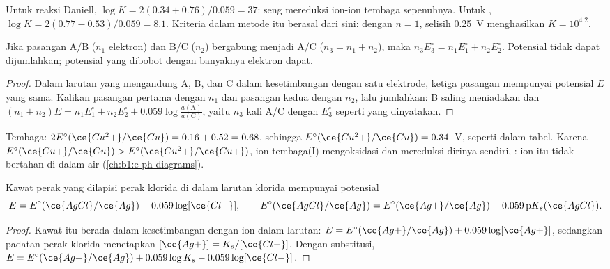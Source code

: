 Untuk reaksi Daniell, $\log K = 2(0.34 + 0.76)/0.059 = 37$: seng
mereduksi ion-ion tembaga sepenuhnya. Untuk
, $\log K = 2(0.77 - 0.53)/0.059 = 8.1$.
Kriteria dalam metode itu berasal dari sini: dengan $n = 1$, selisih
\qty{0.25}{V} menghasilkan $K = 10^{4.2}$.

\begin{proposition}\label{prop:b1:nernst:combined-potentials}
Jika pasangan $\mathrm{A}/\mathrm{B}$ ($n_1$ elektron) dan
$\mathrm{B}/\mathrm{C}$ ($n_2$) bergabung menjadi $\mathrm{A}/\mathrm{C}$
($n_3 = n_1 + n_2$), maka $n_3 E^\circ_3 = n_1 E^\circ_1 + n_2 E^\circ_2$.
Potensial tidak dapat dijumlahkan; potensial yang dibobot dengan
banyaknya elektron dapat.
\end{proposition}

\begin{proof}
Dalam larutan yang mengandung A, B, dan C dalam kesetimbangan dengan satu
elektrode, ketiga pasangan mempunyai potensial $E$ yang sama. Kalikan
 pasangan pertama dengan $n_1$ dan pasangan kedua dengan
$n_2$, lalu jumlahkan:  B saling meniadakan dan $(n_1 + n_2)E = n_1E^\circ_1 + n_2E^\circ_2 +
0.059\log\frac{a(\mathrm{A})}{a(\mathrm{C})}$, yaitu $n_3$ kali  A/C dengan $E^\circ_3$ seperti yang dinyatakan.
\end{proof}

Tembaga: $2E^\circ(\ce{Cu^2+}/\ce{Cu}) = 0.16 + 0.52 = 0.68$, sehingga
$E^\circ(\ce{Cu^2+}/\ce{Cu}) = 0.34$~V, seperti dalam tabel. Karena
$E^\circ(\ce{Cu+}/\ce{Cu}) > E^\circ(\ce{Cu^2+}/\ce{Cu+})$, ion
tembaga(I) mengoksidasi dan mereduksi dirinya sendiri,
: ion itu tidak bertahan di dalam air
(\cref{ch:b1:e-ph-diagrams}).

\begin{proposition}\label{prop:b1:nernst:second-kind}
Kawat perak yang dilapisi perak klorida di dalam larutan klorida
mempunyai potensial
\[
  E = E^\circ(\ce{AgCl}/\ce{Ag}) - 0.059\log[\ce{Cl-}], \qquad
  E^\circ(\ce{AgCl}/\ce{Ag}) = E^\circ(\ce{Ag+}/\ce{Ag}) - 0.059\,\mathrm{p}K_s(\ce{AgCl}) .
\]
\end{proposition}

\begin{proof}
Kawat itu berada dalam kesetimbangan dengan ion  dalam larutan:
$E = E^\circ(\ce{Ag+}/\ce{Ag}) + 0.059\log[\ce{Ag+}]$, sedangkan padatan perak klorida
menetapkan $[\ce{Ag+}] = K_s/[\ce{Cl-}]$. Dengan substitusi,
$E = E^\circ(\ce{Ag+}/\ce{Ag}) + 0.059\log K_s - 0.059\log[\ce{Cl-}]$.
\end{proof}

